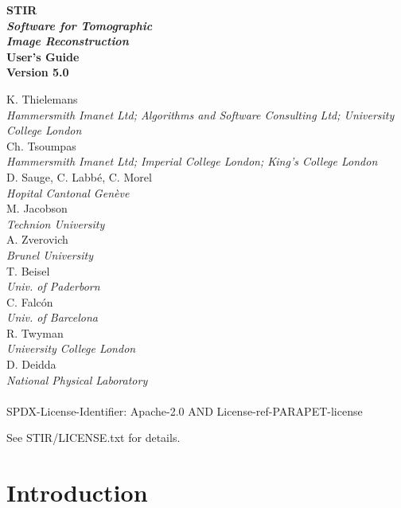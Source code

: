 \documentclass{article}
\begin{document}
\begin{spacing}{2}
\begin{center}

\textbf{
{\Huge  STIR} 
\huge
\\[1cm]
\textit{ Software for  Tomographic \\ Image Reconstruction}
}
\\[3cm]

\textbf{{\huge User's Guide\\
 Version 5.0}}
\end{center}

\end{spacing}

\large 

\noindent 
K. Thielemans \\
{\it \small Hammersmith Imanet Ltd; Algorithms and Software Consulting Ltd; University College London}\\
Ch. Tsoumpas\\ 
{\it \small Hammersmith Imanet Ltd; Imperial College London; King's College London}\\
D. Sauge, C. Labb\'e, C. Morel \\
{\it \small Hopital Cantonal Gen\`eve}\\
M. Jacobson \\
{\it \small Technion University}\\
A. Zverovich \\
{\it \small Brunel University} \\
T. Beisel \\
{\it \small Univ. of Paderborn} \\
C. Falc\'{o}n \\
{\it \small Univ. of Barcelona} \\
R. Twyman \\
{\it \small University College London}\\
D. Deidda \\
{\it \small National Physical Laboratory}
\\
\\

SPDX-License-Identifier: Apache-2.0 AND License-ref-PARAPET-license

See STIR/LICENSE.txt for details.

\newpage

\tableofcontents


\section{
Introduction}
\end{document}
